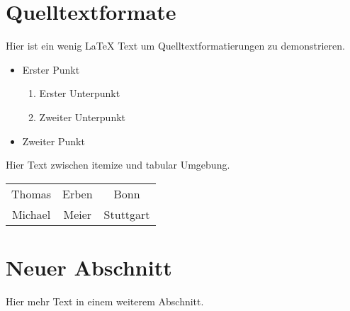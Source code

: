 \documentclass[11pt,a4paper]{scrartcl}
\begin{document}
%
\section{Quelltextformate}
Hier ist ein wenig \LaTeX{} Text um Quelltextformatierungen zu
demonstrieren.
%
\begin{itemize}
  \item Erster Punkt
  \begin{enumerate}
    \item Erster Unterpunkt
    \item Zweiter Unterpunkt
  \end{enumerate}
  \item Zweiter Punkt
\end{itemize}
Hier Text zwischen itemize und tabular Umgebung.
%
\begin{center}
  \begin{tabular}{|c|c|c|}
    Thomas & Erben & Bonn \\
    Michael & Meier & Stuttgart \\
  \end{tabular}
\end{center}
%
\section{Neuer Abschnitt}
Hier mehr Text in einem weiterem Abschnitt.
\end{document}
